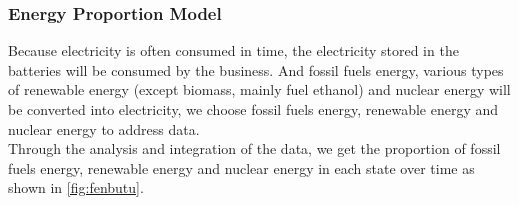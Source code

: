 \documentclass{mcmthesis}
\begin{document}
\subsubsection{Energy Proportion Model}
Because electricity is often consumed in time, the electricity stored in the batteries will be consumed by the business. And fossil fuels energy, various types of renewable energy (except biomass, mainly fuel ethanol) and nuclear energy will be converted into electricity,
we choose fossil fuels energy, renewable energy and nuclear energy to address data. \\
Through the analysis and integration of the data, we get the proportion of fossil fuels energy, renewable energy and nuclear energy in each state over time as shown in \autoref{fig:fenbutu}.\\
\begin{figure}[htbp]
	\centering 	                                        %
\end{figure}
\end{document}
